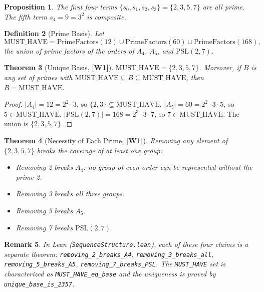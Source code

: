 ﻿\documentclass[11pt]{article}
\newcommand{\wone}[1]{\textcolor{wcolor}{\textbf{[#1]}}}
\newtheorem{theorem}{Theorem}
\newtheorem{definition}[theorem]{Definition}
\newtheorem{proposition}[theorem]{Proposition}
\newtheorem{remark}[theorem]{Remark}
\begin{document}
\begin{proposition}
The first four terms $\{s_0, s_1, s_2, s_3\} = \{2, 3, 5, 7\}$
are all prime. The fifth term $s_4 = 9 = 3^2$ is composite.
\end{proposition}

\begin{definition}[Prime Basis]
Let
\[
\mathrm{MUST\_HAVE}
  = \mathrm{PrimeFactors}(12)
  \cup \mathrm{PrimeFactors}(60)
  \cup \mathrm{PrimeFactors}(168),
\]
the union of prime factors of the orders of $A_4$, $A_5$,
and $\mathrm{PSL}(2,7)$.
\end{definition}

\begin{theorem}[Unique Basis, \wone{W1}]
\label{thm:unique}
$\mathrm{MUST\_HAVE} = \{2, 3, 5, 7\}$.
Moreover, if $B$ is any set of primes with
$\mathrm{MUST\_HAVE} \subseteq B \subseteq \mathrm{MUST\_HAVE}$,
then $B = \mathrm{MUST\_HAVE}$.
\end{theorem}

\begin{proof}
$|A_4| = 12 = 2^2 \cdot 3$, so $\{2, 3\} \subseteq
\mathrm{MUST\_HAVE}$.
$|A_5| = 60 = 2^2 \cdot 3 \cdot 5$, so $5 \in
\mathrm{MUST\_HAVE}$.
$|\mathrm{PSL}(2,7)| = 168 = 2^3 \cdot 3 \cdot 7$, so
$7 \in \mathrm{MUST\_HAVE}$.
The union is $\{2, 3, 5, 7\}$.
\end{proof}

\begin{theorem}[Necessity of Each Prime, \wone{W1}]
\label{thm:necessity}
Removing any element of $\{2, 3, 5, 7\}$ breaks the coverage
of at least one group:
\begin{itemize}
\item Removing 2 breaks $A_4$: no group of even order can
  be represented without the prime 2.
\item Removing 3 breaks all three groups.
\item Removing 5 breaks $A_5$.
\item Removing 7 breaks $\mathrm{PSL}(2,7)$.
\end{itemize}
\end{theorem}

\begin{remark}
In Lean (\texttt{SequenceStructure.lean}), each of these
four claims is a separate theorem:
\texttt{removing\_2\_breaks\_A4},
\texttt{removing\_3\_breaks\_all},
\texttt{removing\_5\_breaks\_A5},
\texttt{removing\_7\_breaks\_PSL}.
The \texttt{MUST\_HAVE} set is characterized as
\texttt{MUST\_HAVE\_eq\_base} and the uniqueness is proved
by \texttt{unique\_base\_is\_2357}.
\end{remark}
\end{document}
